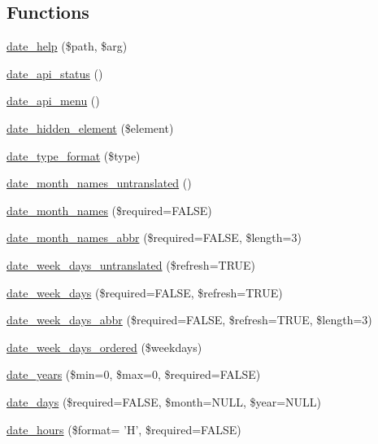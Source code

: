\subsection*{Functions}
\begin{DoxyCompactItemize}
\item 
\hyperlink{date__api_8module_a21d6be4e94853aa99a0bf6db821ef5f8}{date\_\-help} (\$path, \$arg)
\item 
\hyperlink{date__api_8module_a0dd6c7186e678394270216b9d241c729}{date\_\-api\_\-status} ()
\item 
\hyperlink{date__api_8module_a13080af83552f547918ec86a9027ef62}{date\_\-api\_\-menu} ()
\item 
\hyperlink{date__api_8module_adf08b59d3645c530612349f108b4a45d}{date\_\-hidden\_\-element} (\$element)
\item 
\hyperlink{date__api_8module_a9129ade471056bcb658af815dfbc3258}{date\_\-type\_\-format} (\$type)
\item 
\hyperlink{date__api_8module_a8203e4af78f056ba126604d32b17f49b}{date\_\-month\_\-names\_\-untranslated} ()
\item 
\hyperlink{date__api_8module_a4ab8ec4182c77747101651e9ce87a8ea}{date\_\-month\_\-names} (\$required=FALSE)
\item 
\hyperlink{date__api_8module_af6f2f2a2ec22415e16998419b0cca858}{date\_\-month\_\-names\_\-abbr} (\$required=FALSE, \$length=3)
\item 
\hyperlink{date__api_8module_a56d0686e065492539b9caa2e6d6dd5ed}{date\_\-week\_\-days\_\-untranslated} (\$refresh=TRUE)
\item 
\hyperlink{date__api_8module_a55bb6dd6b7339529dda05114c86634a8}{date\_\-week\_\-days} (\$required=FALSE, \$refresh=TRUE)
\item 
\hyperlink{date__api_8module_a8707af09814a3667fe2dc426ad1df671}{date\_\-week\_\-days\_\-abbr} (\$required=FALSE, \$refresh=TRUE, \$length=3)
\item 
\hyperlink{date__api_8module_a80ff7d0168bb360389773fa867f8e210}{date\_\-week\_\-days\_\-ordered} (\$weekdays)
\item 
\hyperlink{date__api_8module_a658020fa9056e86b43cef0d3679c8597}{date\_\-years} (\$min=0, \$max=0, \$required=FALSE)
\item 
\hyperlink{date__api_8module_a9dba2c8bbb9dba52e15626a75f53c4b3}{date\_\-days} (\$required=FALSE, \$month=NULL, \$year=NULL)
\item 
\hyperlink{date__api_8module_a1fcb343f239750316408995fb4ed6f88}{date\_\-hours} (\$format= 'H', \$required=FALSE)

\end{DoxyCompactItemize}
